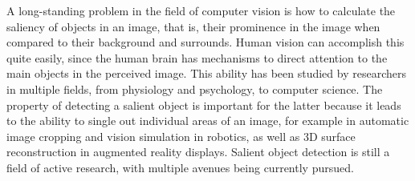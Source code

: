 \documentclass[10pt,twocolumn,letterpaper]{article}
\newcommand{\BOLD}{\textbf}
\begin{document}
A long-standing problem in the field of computer vision is how to calculate the saliency of objects in an image, that is, their prominence in the image when compared to their background and surrounds.  Human vision can accomplish this quite easily, since the human brain has mechanisms to direct attention to the main objects in the perceived image.  This ability has been studied by researchers in multiple fields, from physiology and psychology, to computer science.  The property of detecting a salient object is important for the latter because it leads to the ability to single out individual areas of an image, for example in automatic image cropping and vision simulation in robotics, as well as 3D surface reconstruction in augmented reality displays.  Salient object detection is still a field of active research, with multiple avenues being currently pursued.

\end{document}
